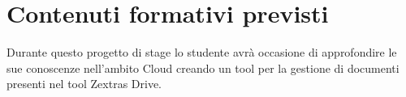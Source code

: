 \section*{Contenuti formativi previsti}
Durante questo progetto di stage lo studente avrà occasione di approfondire le sue conoscenze nell'ambito
Cloud creando un tool per la gestione di documenti presenti nel tool Zextras Drive. 
\newpage